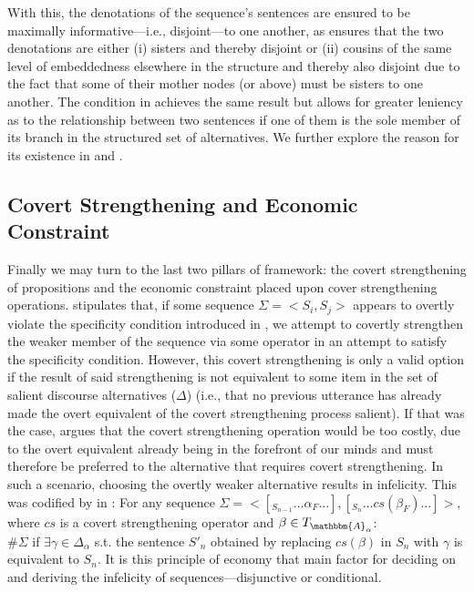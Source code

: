 \xe
With this, the denotations of the sequence's sentences are ensured to be maximally informative---i.e., disjoint---to one another, as  ensures that the two denotations are either (i) sisters and thereby disjoint or (ii) cousins of the same level of embeddedness elsewhere in the structure and thereby also disjoint due to the fact that some of their mother nodes (or above) must be sisters to one another. The condition in  achieves the same result but allows for greater leniency as to the relationship between two sentences if one of them is the sole member of its branch in the structured set of alternatives. We further explore the reason for its existence in  and .

\subsection{Covert Strengthening and Economic Constraint}
Finally we may turn to the last two pillars of  framework: the covert strengthening of propositions and the economic constraint placed upon cover strengthening operations. \textcite{Ippolito2020} stipulates that, if some sequence $\Sigma=<S_i,S_j>$ appears to overtly violate the specificity condition introduced in , we attempt to covertly strengthen the weaker member of the sequence via some operator in an attempt to satisfy the specificity condition. However, this covert strengthening is only a valid option if the result of said strengthening is not equivalent to some item in the set of salient discourse alternatives ($\Delta$) (i.e., that no previous utterance has already made the overt equivalent of the covert strengthening process salient). If that was the case, \textcite{Ippolito2020} argues that the covert strengthening operation would be too costly, due to the overt equivalent already being in the forefront of our minds and must therefore be preferred to the alternative that requires covert strengthening. In such a scenario, choosing the overtly weaker alternative results in infelicity. This was codified by \textcite{Ippolito2020} in :
\ex{}
For any sequence $\Sigma=<[_{S_{n-1}}\ldots\alpha_F\ldots],[_{S_{n}}\ldots cs(\beta_F)\ldots]>$, where $cs$ is a covert strengthening operator and $\beta\in T_{\mathbbm{A}_\alpha}$:\\
$\#\Sigma$ if $\exists\gamma\in\Delta_\alpha$ s.t. the sentence $S'_n$ obtained by replacing $cs(\beta)$ in $S_n$ with $\gamma$ is equivalent to $S_n$.\hfill\parencite[p.~643]{Ippolito2020}
\xe
It is this principle of economy that  main factor for deciding on and deriving the infelicity of sequences---disjunctive or conditional.

